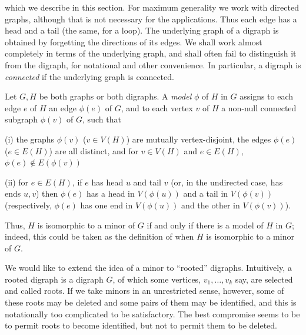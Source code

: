 \noindent which we describe in this section. For maximum generality we work with directed graphs, although that is not necessary for the applications. Thus each edge has a head and a tail (the same, for a loop). The underlying graph of a digraph is obtained by forgetting the directions of its edges. We shall work almost completely in terms of the underlying graph, and shall often fail to distinguish it from the digraph, for notational and other convenience. In particular, a digraph is \textit{connected} if the underlying graph is connected.

Let $G, H$ be both graphs or both digraphs. A \textit{model} $\phi$ of $H$ in $G$ assigns to each edge $e$ of $H$ an edge $\phi(e)$ of $G$, and to each vertex $v$ of $H$ a non-null connected subgraph $\phi(v)$ of $G$, such that

\hspace*{12pt}(i) the graphs $\phi(v)$ ($v \in V(H)$) are mutually vertex-disjoint, the edges $\phi(e)$ ($e \in E(H)$) are all distinct, and for $v \in V(H)$ and $e \in E(H)$, $\phi(e) \notin E(\phi(v))$

\hspace*{12pt}(ii) for $e \in E(H)$, if $e$ has head $u$ and tail $v$ (or, in the undirected case, has ends $u, v$) then $\phi(e)$ has a head in $V(\phi(u))$ and a tail in $V(\phi(v))$ (respectively, $\phi(e)$ has one end in $V(\phi(u))$ and the other in $V(\phi(v))$).

Thus, $H$ is isomorphic to a minor of $G$ if and only if there is a model of $H$ in $G$; indeed, this could be taken as the definition of when $H$ is isomorphic to a minor of $G$.

We would like to extend the idea of a minor to ``rooted'' digraphs. Intuitively, a rooted digraph is a digraph $G$, of which some vertices, $v_1, \dots, v_k$ say, are selected and called roots. If we take minors in an unrestricted sense, however, some of these roots may be deleted and some pairs of them may be identified, and this is notationally too complicated to be satisfactory. The best compromise seems to be to permit roots to become identified, but not to permit them to be deleted.

